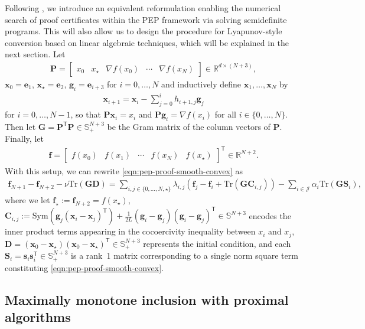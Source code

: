 \documentclass{article}
\theoremstyle{definition}
\theoremstyle{plain}
\newcommand{\ve}{{\mathbf{e}}}
\newcommand{\vf}{{\mathbf{f}}}
\newcommand{\vg}{{\mathbf{g}}}
\newcommand{\vs}{{\mathbf{s}}}
\newcommand{\vx}{{\mathbf{x}}}
\newcommand{\vC}{{\mathbf{C}}}
\newcommand{\vD}{{\mathbf{D}}}
\newcommand{\vG}{{\mathbf{G}}}
\newcommand{\vP}{{\mathbf{P}}}
\newcommand{\vS}{{\mathbf{S}}}
\newcommand{\cJ}{{\mathcal{J}}}
\newcommand{\reals}{\mathbb{R}}
\newcommand{\transpose}{\mathsf{T}}
\begin{document}
Following \citep{TaylorHendrickxGlineur2017_smooth}, we introduce an equivalent reformulation enabling the numerical search of proof certificates within the PEP framework via solving semidefinite programs.
This will also allow us to design the procedure for Lyapunov-style conversion based on linear algebraic techniques, which will be explained in the next section. 
Let
\begin{align*}
    \vP = \begin{bmatrix} x_0 & x_\star & \nabla f(x_0) & \cdots & \nabla f(x_N) \end{bmatrix} \in \reals^{d \times (N+3)} ,
\end{align*}
$\vx_0 = \ve_1$, $\vx_\star = \ve_2$, $\vg_i = \ve_{i+3}$ for $i=0,\dots,N$ and inductively define $\vx_1, \dots, \vx_N$ by
\begin{align*}
    \vx_{i+1} = \vx_i - \sum_{j=0}^i h_{i+1,j} \vg_j
\end{align*}
for $i=0,\dots,N-1$, so that $\vP\vx_i = x_i$ and $\vP\vg_i = \nabla f(x_i)$ for all $i\in \{0,\dots,N\}$.
Then let $\vG = \vP^\transpose \vP \in \mathbb{S}_+^{N+3}$ be the Gram matrix of the column vectors of $\vP$.
Finally, let
\begin{align*}
    \vf = \begin{bmatrix} f(x_0) & f(x_1) & \cdots & f(x_N) & f(x_\star) \end{bmatrix}^\transpose \in \reals^{N+2} .
\end{align*}
With this setup, we can rewrite \eqref{eqn:pep-proof-smooth-convex} as
\begin{align*}
    \mathbf{f}_{N+1} - \mathbf{f}_{N+2} - \nu \mathrm{Tr}(\vG \vD) = \sum_{i,j\in \{0,\dots,N,\star\}} \lambda_{i,j} (\vf_j - \vf_i + \mathrm{Tr}(\vG\vC_{i,j})) - \sum_{i\in \cJ} \alpha_i \mathrm{Tr}(\vG \vS_i) ,
\end{align*}
where we let $\vf_\star := \vf_{N+2} = f(x_\star)$, $\vC_{i,j} := \mathrm{Sym}\left( \vg_j \left(\vx_i - \vx_j\right)^\transpose \right) + \frac{1}{2L} (\vg_i - \vg_j) (\vg_i - \vg_j)^\transpose \in \mathbb{S}^{N+3}$ encodes the inner product terms appearing in the cocoercivity inequality between $x_i$ and $x_j$,
$\vD = (\vx_0-\vx_\star)(\vx_0-\vx_\star)^\transpose \in \mathbb{S}_+^{N+3}$ represents the initial condition, and each $\vS_i = \vs_i \vs_i^\transpose \in \mathbb{S}_+^{N+3}$ is a rank~1 matrix corresponding to a single norm square term constituting \eqref{eqn:pep-proof-smooth-convex}.

\subsection{Maximally monotone inclusion with proximal algorithms}
\label{section:setting-proximal-monotone-inclusion}
\end{document}
